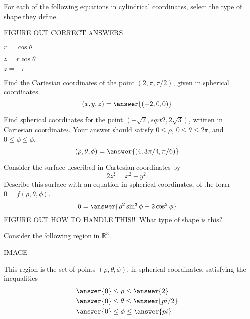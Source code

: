 \documentclass{ximera}
\begin{document}
\begin{problem}
For each of the following equations in cylindrical coordinates, select the type of shape they define.

FIGURE OUT CORRECT ANSWERS

$r = \cos\theta$
\begin{multipleChoice}
\end{multipleChoice}

$z = r\cos\theta$
\begin{multipleChoice}
\end{multipleChoice}

$z = -r$
\begin{multipleChoice}
\end{multipleChoice}
\end{problem}

\begin{problem}
Find the Cartesian coordinates of the point $(2, \pi, \pi/2)$, given in spherical coordinates.
\[
(x,y,z) = \answer{(-2,0,0)}
\]
\end{problem}

\begin{problem}
Find spherical coordinates for the point $\left(-\sqrt{2}, sqrt{2}, 2\sqrt{3}\right)$, written in Cartesian coordinates. Your answer should satisfy $0\leq \rho$, $0\leq \theta \leq 2\pi$, and $0\leq \phi \leq \phi$.
\[
(\rho, \theta, \phi) = \answer{(4, 3\pi/4, \pi/6)}
\]
\end{problem}

\begin{problem}
Consider the surface described in Cartesian coordinates by
\[
2z^2 = x^2 +y^2.
\]
Describe this surface with an equation in spherical coordinates, of the form $0=f(\rho, \theta, \phi)$.
\[
0=\answer{\rho^2\sin^2\phi - 2\cos^2\phi}
\]
FIGURE OUT HOW TO HANDLE THIS!!!
What type of shape is this?
\begin{multipleChoice}
\end{multipleChoice}
\end{problem}

\begin{problem}
Consider the following region in $\mathbb{R}^3$.

IMAGE

This region is the set of points $(\rho,\theta,\phi)$, in spherical coordinates, satisfying the inequalities
\begin{align*}
&\answer{0}\leq\rho\leq \answer{2}\\
&\answer{0}\leq\theta\leq\answer{pi/2}\\
&\answer{0}\leq\phi\leq\answer{pi}
\end{align*}

\end{problem}
\end{document}
